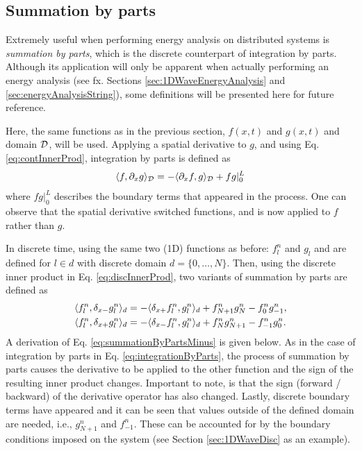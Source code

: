 \subsection{Summation by parts}\label{sec:summationByParts}
Extremely useful when performing energy analysis on distributed systems is \textit{summation by parts}, which is the discrete counterpart of integration by parts. Although its application will only be apparent when actually performing an energy analysis (see fx. Sections \ref{sec:1DWaveEnergyAnalysis} and \ref{sec:energyAnalysisString}), some definitions will be presented here for future reference.

Here, the same functions as in the previous section, $f(x,t)$ and $g(x,t)$ and domain $\mathcal{D}$, will be used. Applying a spatial derivative to $g$, and using Eq. \eqref{eq:contInnerProd}, integration by parts is defined as
\begin{equation}\label{eq:integrationByParts}
    \langle f, \partial_x g \rangle_{\mathcal{D}} = -\langle \partial_x f, g\rangle_{\mathcal{D}} + fg|_0^L
\end{equation}
where $fg|_0^L$ describes the boundary terms that appeared in the process. One can observe that the spatial derivative switched functions, and is now applied to $f$ rather than $g$.

In discrete time, using the same two (1D) functions as before: $f_l^n$ and $g_l$ and are defined for $l\in d$ with discrete domain $d=\{0, \hdots, N\}$. Then, using the discrete inner product in Eq. \eqref{eq:discInnerProd}, two variants of summation by parts are defined as
\begin{subequations}\label{eq:summationByParts}
    \begin{align}
        \langle f_l^n, \delta_{x-} g_l^n \rangle_d  &= -\langle \delta_{x+} f_l^n, g_l^n\rangle_d + f_{N+1}^ng_N^n - f_0^ng_{-1}^n,\label{eq:summationByPartsMinus}\\
        \langle f_l^n, \delta_{x+} g_l^n \rangle_d 
        &= -\langle \delta_{x-} f_l^n, g_l^n\rangle_d + f_N^ng_{N+1}^n - f_{-1}^ng_0^n.\label{eq:summationByPartsPlus}
    \end{align}
\end{subequations}
A derivation of Eq. \eqref{eq:summationByPartsMinus} is given below. As in the case of integration by parts in Eq. \eqref{eq:integrationByParts}, the process of summation by parts causes the derivative to be applied to the other function and the sign of the resulting inner product changes. Important to note, is that the sign (forward / backward) of the derivative operator has also changed. Lastly, discrete boundary terms have appeared and it can be seen that values outside of the defined domain are needed, i.e., $g_{N+1}^n$ and $f_{-1}^n$. These can be accounted for by the boundary conditions imposed on the system (see Section \ref{sec:1DWaveDisc} as an example). 

